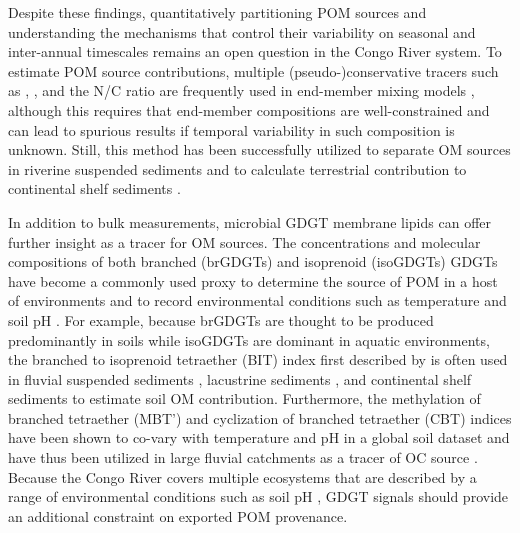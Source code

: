 Despite these findings, quantitatively partitioning POM sources and understanding the mechanisms that control their variability on seasonal and inter-annual timescales remains an open question in the Congo River system. To estimate POM source contributions, multiple (pseudo-)conservative tracers such as , , and the N/C ratio are frequently used in end-member mixing models \citep{Perdue:2007fn,Weijers:2009iu,Hilton:2010cg,Hossler:2012jh}, although this requires that end-member compositions are well-constrained and can lead to spurious results if temporal variability in such composition is unknown. Still, this method has been successfully utilized to separate OM sources in riverine suspended sediments \citep{Hilton:2010cg,Hossler:2012jh} and to calculate terrestrial contribution to continental shelf sediments \citep{Gordon:2004id,Weijers:2009iu}. 

In addition to bulk measurements, microbial GDGT membrane lipids can offer further insight as a tracer for OM sources. The concentrations and molecular compositions of both branched (brGDGTs) and isoprenoid (isoGDGTs) GDGTs have become a commonly used proxy to determine the source of POM in a host of environments and to record environmental conditions such as temperature and soil pH \citep[see][for review]{Castaneda:2011jb,Schouten:2013bd}. For example, because brGDGTs are thought to be produced predominantly in soils while isoGDGTs are dominant in aquatic environments, the branched to isoprenoid tetraether (BIT) index first described by \citet{Hopmans:2004kx} is often used in fluvial suspended sediments \citep{Kim:2012fq,Zell:2014gt}, lacustrine sediments \citep{Tierney:2010br}, and continental shelf sediments \citep{Peterse:2009hl,Weijers:2009iu} to estimate soil OM contribution. Furthermore, the methylation of branched tetraether (MBT') and cyclization of branched tetraether (CBT) indices have been shown to co-vary with temperature and pH in a global soil dataset \citep{Weijers:2007gu,Peterse:2012bs,DeJonge:2014kw} and have thus been utilized in large fluvial catchments as a tracer of OC source \citep{Zell:2013eg,DeJonge:2014fs}. Because the Congo River covers multiple ecosystems that are described by a range of environmental conditions such as soil pH \citep{Mayaux:2004uw,Spencer:2012en}, GDGT signals should provide an additional constraint on exported POM provenance.

